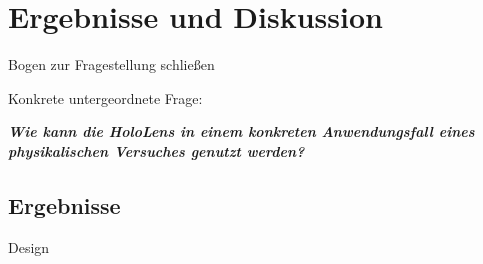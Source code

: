 \section{Ergebnisse und Diskussion}
\label{sec-6}
Bogen zur Fragestellung schließen

Konkrete untergeordnete Frage:
\begin{center}
	\textit{\textbf{Wie kann die HoloLens in einem konkreten Anwendungsfall eines physikalischen Versuches genutzt werden?}}
\end{center}

\begin{comment}
\subsection{Aufgabenstellung}

Im Rahmen der Arbeit soll anhand der HoloLens untersucht werden, wie diese in der Physik-Lehre eingesetzt werden kann, um physikalische Inhalte zu vermitteln. Insbesondere soll betrachtet werden, wie physikalische Experimente mittels Mixed Reality Anwendungen durch zusätzliche Inhalte angereichert werden können.\\

\par
Dazu sind zunächst die technischen Möglichkeiten und Voraussetzungen der HoloLens zu betrachten und in Zusammenhang mit dem Anwendungsfall zu bringen. Weiterhin sind bestehende Ansätze im Einsatz von Mixed Reality Technologie in der Lehre, besonders in der Physik-Lehre, herauszuarbeiten und einzuordnen.

Davon ausgehend soll der Fragestellung anhand eines konkreten Beispiels nachgegangen werden. Für einen ausgewählten Versuchsaufbau sind die darzustellenden Objekte und Informationen sowie das Zusammenspiel dieser mit dem aufgebauten Experiment, der Umgebung und den Nutzern zu entwickeln. Für den ausgewählten Anwendungsfall soll eine Umsetzung mit der HoloLens konzipiert, designet und prototypisch implementiert werden.
\end{comment}

\subsection{Ergebnisse}
Design

